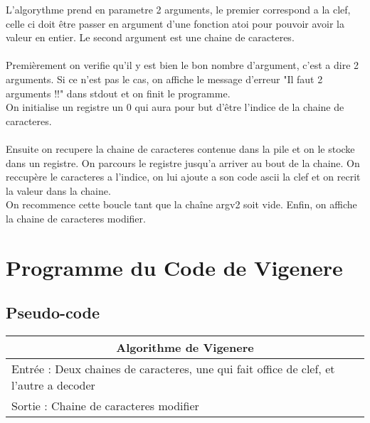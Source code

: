 \documentclass[a4paper, 12pt]{article}
\begin{document}
L'algorythme prend en parametre 2 arguments, le premier correspond a la clef, celle ci doit être passer en argument d'une fonction atoi pour pouvoir avoir la valeur en entier.
Le second argument est une chaine de caracteres.
\\
\\
Premièrement on verifie qu'il y est bien le bon nombre d'argument, c'est a dire 2 arguments. Si ce n'est pas le cas, on affiche le message d'erreur "Il faut 2 arguments !!" dans stdout et on finit le programme.
\\
On initialise un registre un 0 qui aura pour but d'être l'indice de la chaine de caracteres.
\\
\\
Ensuite on recupere la chaine de caracteres contenue dans la pile et on le stocke dans un registre. On parcours le registre jusqu'a arriver au bout de la chaine. On reccupère le caracteres a l'indice, on lui ajoute a son code ascii la clef et on recrit la valeur dans la chaine.
\\
On recommence cette boucle tant que la chaîne argv2 soit vide.
Enfin, on affiche la chaine de caracteres modifier.
\\

\newpage

\section{Programme du Code de Vigenere}


\subsection{Pseudo-code}

\begin{center}
  \begin{tabularx}{\textwidth}{|X|}
    \hline
    \multicolumn{1}{|c|}{ Algorithme de Vigenere } \\
    \hline
    Entrée : Deux chaines de caracteres, une qui fait office de clef, et l'autre a decoder  \\
    \hline
    Sortie : Chaine de caracteres modifier  \\
    \hline
  \end{tabularx}
\end{center}
\end{document}
